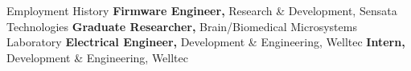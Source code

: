 
\begin{rubric}{\faBriefcase[solid] Employment History}
\entry*[2024 -- now][]%
	\textbf{Firmware Engineer,} Research \& Development, Sensata Technologies
%
%
\entry*[2021 -- 2023][]%
	\textbf{Graduate Researcher,} Brain/Biomedical Microsystems Laboratory
%
\entry*[2015 -- 2017][]%
	\textbf{Electrical Engineer,} Development \& Engineering, Welltec
%
\entry*[2014 -- 2015][]%
	\textbf{Intern,} Development \& Engineering, Welltec
%
\end{rubric}